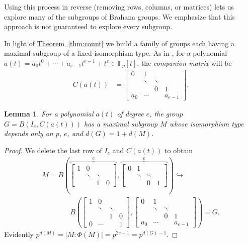 \documentclass[11pt]{article}
\numberwithin{equation}{section}
\theoremstyle{definition}
\theoremstyle{plain}
\newcommand{\expref}[2]{\hyperref[#2]{#1~\ref{#2}}}
\numberwithin{equation}{section}
\theoremstyle{plain}       %
\newtheorem{lem}[equation]{Lemma}
\theoremstyle{remark}
\theoremstyle{definition}
\numberwithin{figure}{section}
\numberwithin{table}{section}
\newcommand{\bbF}{\mathbb{F}}  %
\begin{document}
Using this process in reverse (removing rows, columns, or matrices) lets us
explore many of the subgroups of Brahana groups.  We emphasize that this
approach is not guaranteed to explore every subgroup.
\medskip

In light of \expref{Theorem}{thm:count} we build a family of groups each having a
maximal subgroup of a fixed isomorphism type.  As in \cite[p. 70]{JacII}, for a
polynomial $a(t)=a_0t^0+\cdots +a_{e-1}t^{e-1}+t^e\in \bbF_p[t]$, the
\emph{companion matrix} will be 
\begin{align*}
	C(a(t)) & = 	\begin{bmatrix}
		0 & 1 & \\
		 & \ddots & \ddots\\
		  & & 0 & 1\\
		a_0 & \cdots & & a_{e-1}
	\end{bmatrix}.
\end{align*}

\begin{lem}\label{lem:flat}
	For a polynomial $a(t)$ of degree $e$, the group $G=B(I_e,C(a(t)))$ has a
	maximal subgroup $M$ whose isomorphism type depends only on $p$, $e$, and
	$d(G)=1+d(M)$.
\end{lem}

\begin{proof} 
We delete the last row of $I_e$ and $C(a(t))$ to obtain
\begin{align*}
 	M=B\left(
	\overbrace{\begin{bmatrix}
		1 & 0  & \\
		 & \ddots & \ddots\\
		 & & 1 & 0
	\end{bmatrix}}^e,
	\overbrace{\begin{bmatrix}
		0 & 1 & \\
		 & \ddots & \ddots\\
		 & & 0 & 1
	\end{bmatrix}}^e
	\right)
	\hookrightarrow \qquad \qquad\\
	\qquad\qquad
 	B\left(\begin{bmatrix}
		1 & 0  & \\
		 & \ddots & \ddots \\
		 & & 1 & 0\\
		 \hline
		 0 &\cdots & & 1
	\end{bmatrix},
	\begin{bmatrix}
		0 & 1 & \\
		 & \ddots & \ddots\\
		  & & 0 & 1\\
		  \hline
		a_0 & \cdots & & a_{e-1}
	\end{bmatrix}
	\right)=G.
\end{align*}
Evidently $p^{d(M)}=|M:\Phi(M)|=p^{2e-1}=p^{d(G)-1}$.
\end{proof}
\end{document}
